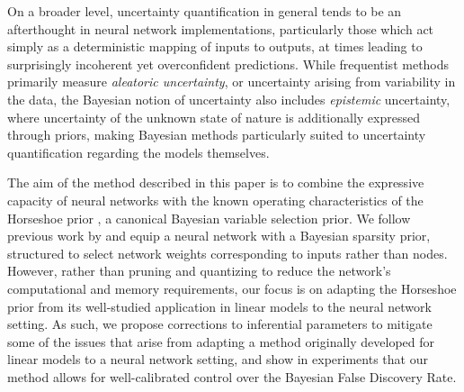 


On a broader level, uncertainty quantification in general tends to be an afterthought in neural network implementations, particularly those which act simply as a deterministic mapping of inputs to outputs, at times leading to surprisingly incoherent yet overconfident predictions.  While frequentist methods primarily measure \textit{aleatoric uncertainty}, or uncertainty arising from variability in the data, the Bayesian notion of uncertainty also includes \textit{epistemic} uncertainty, where uncertainty of the unknown state of nature is additionally expressed through priors, making Bayesian methods particularly suited to uncertainty quantification regarding the models themselves. 


The aim of the method described in this paper is to combine 
the expressive capacity of neural networks with the known operating characteristics
of the Horseshoe prior \citep{carvalho_handling_2009, carvalho2010horseshoe}, a canonical Bayesian variable selection prior.  We follow previous work 
by \cite{louizos2017bayesian} and equip a neural network with a 
Bayesian sparsity prior, structured to select network weights 
corresponding to inputs rather than nodes.  However, rather than pruning and quantizing to reduce the network's 
computational and memory requirements, our focus is on adapting the Horseshoe prior \citep{carvalho_handling_2009,
carvalho_horseshoe_2010}
from its well-studied application in linear models to the neural network setting.  As such, we propose 
corrections to inferential parameters to mitigate some of the issues 
that arise from adapting a method originally developed for linear models 
to a neural network setting, and show in experiments that our method allows for well-calibrated control over the Bayesian False Discovery Rate.




